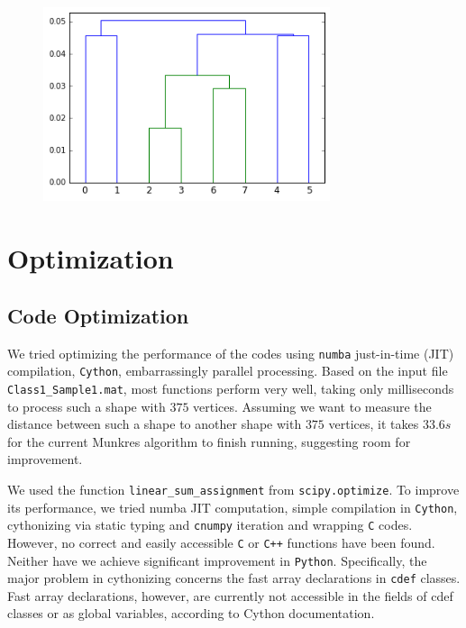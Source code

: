 \documentclass[codesnippet]{jss}
\begin{document}
\begin{figure}
\centering
\includegraphics[width = 0.75\textwidth]{../real_dendogram.png}
\caption{\label{dendogram}}
\end{figure}

\section[optimization]{Optimization}
\subsection{Code Optimization}
We tried optimizing the performance of the codes using \texttt{numba} just-in-time (JIT) compilation, \texttt{Cython}, embarrassingly parallel processing. Based on the input file \texttt{Class1\_Sample1.mat}, most functions perform very well, taking only milliseconds to process such a shape with $375$ vertices. Assuming we want to measure the distance between such a shape to another shape with $375$ vertices, it takes $33.6s$ for the current Munkres algorithm to finish running, suggesting room for improvement.

We used the function \texttt{linear\_sum\_assignment}  from \texttt{scipy.optimize}. To improve its performance, we tried numba JIT computation, simple compilation in \texttt{Cython}, cythonizing via static typing and \texttt{cnumpy} iteration and wrapping \texttt{C} codes. However, no correct and easily accessible \texttt{C} or \texttt{C++} functions have been found. Neither have we achieve significant improvement in \texttt{Python}. Specifically, the major problem in cythonizing concerns the fast array declarations in \texttt{cdef} classes. Fast array declarations, however, are currently not accessible in the fields of cdef classes or as global variables, according to Cython documentation.
\end{document}
